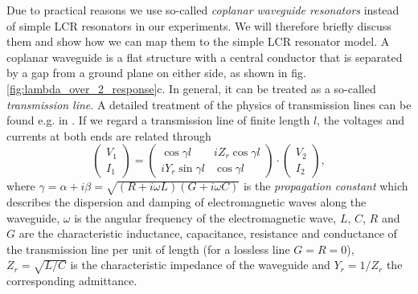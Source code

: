 Due to practical reasons we use so-called {\it coplanar waveguide resonators} instead of simple LCR resonators in our experiments. We will therefore briefly discuss them and show how we can map them to the simple LCR resonator model. A coplanar waveguide is a flat structure with a central conductor that is separated by a gap from a ground plane on either side, as shown in fig. \ref{fig:lambda_over_2_response}c. In general, it can be treated as a so-called {\it transmission line}. A detailed treatment of the physics of transmission lines can be found e.g. in \cite{pozar_microwave_2011}.  If we regard a transmission line of finite length $l$, the voltages and currents at both ends are related through \citep{pozar_microwave_2011}
%
\begin{equation}
\left( \begin{array}{c} V_1 \\ I_1 \end{array}\right) = \left( 
		\begin{array}{cc}
			\cos{\gamma l} & iZ_r \cos{\gamma l} \\
			i Y_r \sin{\gamma l} & \cos{\gamma l}
		\end{array}
		\right) \cdot \left(
		\begin{array}{c}
			V_2 \\ I_2
		\end{array}
		\right), \label{eq:cpw_abcd_matrix}
\end{equation}
%
where $\gamma = \alpha+i\beta = \sqrt{(R+i\omega L)(G+i\omega C)}$ is the {\it propagation constant} which describes the dispersion and damping of electromagnetic waves along the waveguide, $\omega$ is the angular frequency of the electromagnetic wave, $L$, $C$, $R$ and $G$ are the characteristic inductance, capacitance, resistance and conductance of the transmission line per unit of length (for a lossless line $G=R=0$), $Z_r=\sqrt{L/C}$ is the characteristic impedance of the waveguide and $Y_r=1/Z_r$ the corresponding admittance. 

\smallskip

